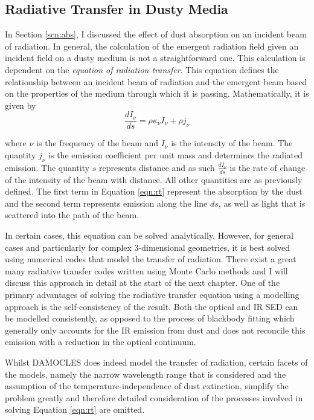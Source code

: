 \subsection{Radiative Transfer in Dusty Media}
\label{scn:rt}
In Section \ref{scn:abs}, I discussed the effect of dust absorption on an incident beam of radiation.  In general, the calculation of the emergent radiation field given an incident field on a dusty medium is not a straightforward one.  This calculation is dependent on the {\em equation of radiation transfer}.  This equation defines the relationship between an incident beam of radiation and the emergent beam based on the properties of the medium through which it is passing.  Mathematically, it is given by 
\begin{equation}
\label{eqn:rt}
\frac{dI_{\nu}}{ds}=\rho \kappa_{\nu} I_{\nu} + \rho j_{\nu}
\end{equation}
 
\noindent where $\nu$ is the frequency of the beam and $I_{\nu}$ is the intensity of the beam.  The quantity $j_{\nu}$ is the emission coefficient per unit mass and determines the radiated emission.  The quantity $s$ represents distance and as such $\frac{dI_{\nu}}{ds}$ is the rate of change of the intensity of the beam with distance.  All other quantities are as previously defined.  The first term in Equation \ref{eqn:rt} represent the absorption by the dust and the second term represents emission along the line $ds$, as well as light that is scattered into the path of the beam.

In certain cases, this equation can be solved analytically.  However, for general cases and particularly for complex 3-dimensional geometries, it is best solved using numerical codes that model the transfer of radiation.  There exist a great many radiative transfer codes written using Monte Carlo methods and I will discuss this approach in detail at the start of the next chapter.  One of the primary advantages of solving the radiative transfer equation using a modelling approach is the self-consistency of the result.  Both the optical and IR SED can be modelled consistently, as opposed to the process of blackbody fitting which generally only accounts for the IR emission from dust and does not reconcile this emission with a reduction in the optical continuum.

Whilst DAMOCLES does indeed model the transfer of radiation, certain facets of the models, namely the narrow wavelength range that is considered and the assumption of the temperature-independence of dust extinction, simplify the problem greatly and therefore detailed consideration of the processes involved in solving Equation \ref{eqn:rt} are omitted.

